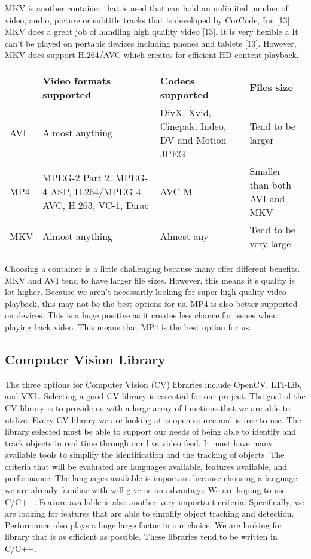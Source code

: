 \documentclass[letterpaper,10pt,onecolumn,draftclsnofoot]{IEEEtran}
\begin{document}
MKV is another container that is used that can hold an unlimited number of video, audio, picture or subtitle tracks  that is developed by CorCode, Inc [13].
MKV does a great job of handling high quality video [13].
It is very flexible a
It can't be played on portable devices including phones and tablets [13].
However, MKV does support H.264/AVC which creates for efficient HD content playback.

\begin{center}
	\begin{tabular}{|p{2cm}|p{5cm}|p{4cm}|p{4cm}|}
		
		\hline
		\textbf{} & \textbf{Video formats supported} & \textbf{Codecs supported} & \textbf{Files size} \\
		\hline
		AVI & Almost anything & DivX, Xvid, Cinepak, Indeo, DV and Motion JPEG & Tend to be larger \\
		\hline
		MP4 & MPEG-2 Part 2, MPEG-4 ASP, H.264/MPEG-4 AVC, H.263, VC-1, Dirac & AVC M & Smaller than both AVI and MKV \\
		\hline
		MKV & Almost anything & Almost any & Tend to be very large \\
		\hline
		
	\end{tabular}
\end{center}

Choosing a container is a little challenging because many offer different benefits.
MKV and AVI tend to have larger file sizes.
However, this means it's quality is lot higher.
Because we aren't necessarily looking for super high quality video playback, this may not be the best options for us.
MP4 is also better supported on devices.
This is a huge positive as it creates less chance for issues when playing back video.
This means that MP4 is the best option for us.


\newpage
\subsection{Computer Vision Library} %
The three options for Computer Vision (CV) libraries include OpenCV, LTI-Lib, and VXL.
Selecting a good CV library is essential for our project.
The goal of the CV library is to provide us with a large array of functions that we are able to utilize.
Every CV library we are looking at is open source and is free to use.
The library selected must be able to support our needs of being able to identify and track objects in real time through our live video feed.
It must have many available tools to simplify the identification and the tracking of objects.
The criteria that will be evaluated are languages available, features available, and performance.
The languages available is important because choosing a language we are already familiar with will give us an advantage.
We are hoping to use C/C++.
Feature available is also another very important criteria.
Specifically, we are looking for features that are able to simplify object tracking and detection.
Performance also plays a huge large factor in our choice.
We are looking for library that is as efficient as possible.
These libraries tend to be written in C/C++.
\end{document}
